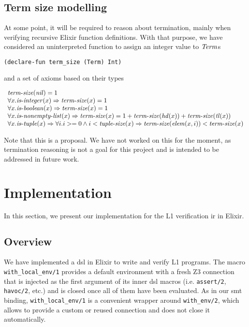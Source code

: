 \subsection{Term size modelling}

At some point, it will be required to reason about termination, mainly when 
verifying recursive Elixir function definitions. With that purpose, we have 
considered an uninterpreted function to assign an integer value to $\mathit{Term}$s

\begin{verbatim}
(declare-fun term_size (Term) Int)
\end{verbatim}

and a set of axioms based on their types

\[
\begin{array}{l}
\mathit{term\mbox{-}size}(\mathit{nil}) = 1\\
\forall x. \mathit{is\mbox{-}integer}(x) \Rightarrow \mathit{term\mbox{-}size}(x) = 1\\
\forall x. \mathit{is\mbox{-}boolean}(x) \Rightarrow \mathit{term\mbox{-}size}(x) = 1\\
\forall x. \mathit{is\mbox{-}nonempty\mbox{-}list}(x) \Rightarrow \mathit{term\mbox{-}size}(x) = 1 + \mathit{term\mbox{-}size}(\mathit{hd}(x)) + \mathit{term\mbox{-}size}(\mathit{tl}(x))\\
\forall x. \mathit{is\mbox{-}tuple}(x) \Rightarrow \forall i. i >= 0 \wedge i < \mathit{tuple\mbox{-}size}(x) \Rightarrow \mathit{term\mbox{-}size}(\mathit{elem}(x, i)) < \mathit{term\mbox{-}size}(x)\\
\end{array}
\]

Note that this is a proposal. We have not worked on this for the moment, as
termination reasoning is not a goal for this project and is intended to be
addressed in future work.

\section{Implementation}
\label{ir:l1implementation}

In this section, we present our implementation for the L1 verification \gls{ir}
in Elixir.

\subsection{Overview}
\label{ir:dslexample}

We have implemented a \gls{dsl} in Elixir to write and verify L1 programs. The
macro \verb|with_local_env/1| provides a default environment with a fresh Z3
connection that is injected as the first argument of its inner \gls{dsl} macros
(i.e. \verb|assert/2|, \verb|havoc/2|, etc.) and is closed once all of them have
been evaluated. As in our \acrshort{smt} binding, \verb|with_local_env/1| is a
convenient wrapper around \verb|with_env/2|, which allows to provide a custom or
reused connection and does not close it automatically.

